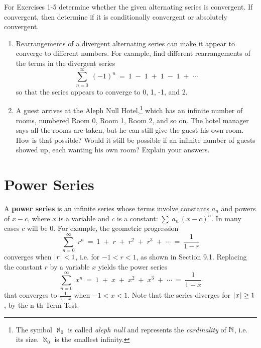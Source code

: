 \divider
\vspace{2mm}
\startexercises\label{sec9dot3}
{\small
{}
\par\noindent For Exercises 1-5 determine whether the given alternating series is
convergent. If convergent, then determine if it is conditionally convergent or
absolutely convergent.
\begin{enumerate}[item-label={\bfseries \arabic*.}]
 \item Rearrangements of a divergent alternating series can make it appear to
 converge to different numbers. For example, find different rearrangements of
 the terms in the divergent series
\[
\sum_{n=0}^{\infty} \;(-1)^n ~=~ 1 \;-\; 1 \;+\; 1 \;-\; 1 \;+\; \cdots
\]
 so that the series appears to converge to 0, 1, -1, and 2.
 \item A guest arrives at the Aleph Null Hotel,\footnote{The symbol $\aleph_0$
 is called \emph{aleph null} and represents the \emph{cardinality} of
 $\mathbb{N}$, i.e. its size. $\aleph_0$ is the smallest infinity.} which has an
 infinite number of rooms, numbered Room 0, Room 1, Room 2, and so on. The hotel
 manager says all the rooms are taken, but he can still give the guest his own
 room. How is that possible? Would it still be possible if an infinite number of
 guests showed up, each wanting his own room? Explain your answers.
\end{enumerate}
}
\newpage
\section{Power Series}
A \textbf{power series} is an infinite series whose
terms involve constants $a_n$ and powers of $x-c$, where $x$ is a variable and
$c$ is a constant: $\sum\;a_n\,(x-c)^n$. In many cases $c$ will be 0. For
example, the geometric progression
\[
\sum_{n=0}^{\infty} \;r^n ~=~ 
1 \;+\; r \;+\; r^2 \;+\; r^3 \;+\; \cdots ~=~  \frac{1}{1-r}
\]
converges when $\lvert\mspace{1mu}r\mspace{1mu}\rvert < 1$, i.e. for $-1<r<1$, as shown in Section 9.1.
Replacing the constant $r$ by a variable $x$ yields the power series
\begin{equation}\label{eqn:1over1minusx}
\sum_{n=0}^{\infty} \;x^n ~=~ 
1 \;+\; x \;+\; x^2 \;+\; x^3 \;+\; \cdots ~=~  \frac{1}{1-x}
\end{equation}
that converges to $\frac{1}{1-x}$ when $-1<x<1$. Note that the series diverges
for $\lvert\mspace{1mu}x\mspace{1mu}\rvert\ge 1$, by the n-th Term Test.

